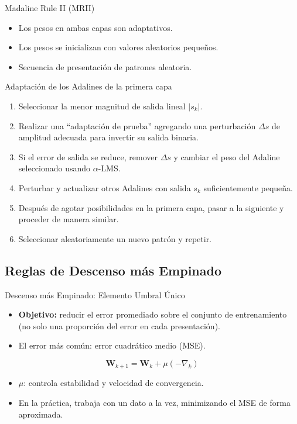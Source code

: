 \documentclass[aspectratio=169,utf8,spanish]{beamer}
\begin{document}
\begin{frame}{Madaline Rule II (MRII)}
  \begin{itemize}
    \item Los pesos en ambas capas son adaptativos.
    \item Los pesos se inicializan con valores aleatorios pequeños.
    \item Secuencia de presentación de patrones aleatoria.
  \end{itemize}

  \begin{block}{Adaptación de los Adalines de la primera capa}
    \begin{enumerate}
      \item Seleccionar la menor magnitud de salida lineal $|s_k|$.
      \item Realizar una ``adaptación de prueba'' agregando una perturbación $\Delta s$ de amplitud adecuada para invertir su salida binaria.
      \item Si el error de salida se reduce, remover $\Delta s$ y cambiar el peso del Adaline seleccionado usando $\alpha$-LMS.
      \item Perturbar y actualizar otros Adalines con salida $s_k$ suficientemente pequeña.
      \item Después de agotar posibilidades en la primera capa, pasar a la siguiente y proceder de manera similar.
      \item Seleccionar aleatoriamente un nuevo patrón y repetir.
    \end{enumerate}
  \end{block}
\end{frame}


\subsection{Reglas de Descenso más Empinado}

\begin{frame}{Descenso más Empinado: Elemento Umbral Único}
  \begin{itemize}
    \item \textbf{Objetivo:} reducir el error promediado sobre el conjunto de entrenamiento (no solo una proporción del error en cada presentación).
    \item El error más común: error cuadrático medio (MSE).
  \end{itemize}

  \begin{equation*}
    \mathbf{W}_{k+1} = \mathbf{W}_k + \mu(-\nabla_k)
  \end{equation*}

  \begin{itemize}
    \item $\mu$: controla estabilidad y velocidad de convergencia.
    \item En la práctica, trabaja con un dato a la vez, minimizando el MSE de forma aproximada.
  \end{itemize}
\end{frame}
\end{document}
